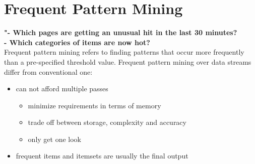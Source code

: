 \documentclass[a4paper, 12pt]{book} %
\begin{document}
\chapter{Frequent Pattern Mining}
\large{\textbf{"- Which pages are getting an unusual hit in the last 30 minutes? \\
		   \indent- Which categories of items are now hot?}}\\


Frequent pattern mining refers to finding patterns that occur more frequently than a pre-specified threshold value. Frequent pattern mining over data streams differ from conventional one:
\begin{itemize}
	\item can not afford multiple passes 
	\begin{itemize}
		\item minimize requirements in terms of memory
		\item trade off between storage, complexity and accuracy
		\item only get one look
	\end{itemize}
	\item frequent items and itemsets are usually the final output
\end{itemize}
\end{document}
